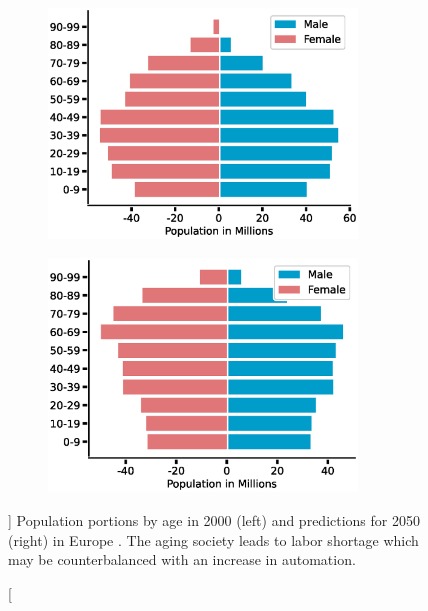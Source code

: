 \begin{figure}[ht]
  \begin{subfigure}{0.5\textwidth}
    \centering
    \includegraphics[width=0.9\textwidth]{src/introduction/img/population_2000.eps}
  \end{subfigure}%
  \begin{subfigure}{0.5\textwidth}
    \centering
    \includegraphics[width=0.9\textwidth]{src/introduction/img/population_2050.eps}
  \end{subfigure}
  \caption
  []
  {
    Population portions by age in 2000 (left) and predictions for
    2050 (right) in Europe \footnotemark. The aging society leads to labor shortage
    which may be counterbalanced with an increase in
    automation.
  }
  \label{fig:demographic_change}
\end{figure}


